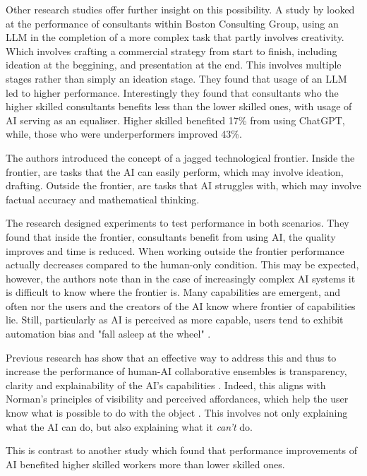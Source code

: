 Other research studies offer further insight on this possibility. A study by \cite{DellAcqua2023-og} looked at the performance of consultants within Boston Consulting Group, using an LLM in the completion of a more complex task that partly involves creativity. Which involves crafting a commercial strategy from start to finish, including ideation at the beggining, and presentation at the end. This involves multiple stages rather than simply an ideation stage. They found that usage of an LLM led to higher performance. Interestingly they found that consultants who the higher skilled consultants benefits less than the lower skilled ones, with usage of AI serving as an equaliser. Higher skilled benefited 17\% from using ChatGPT, while, those who were underperformers improved 43\%. 

The authors introduced the concept of a jagged technological frontier. Inside the frontier, are tasks that the AI can easily perform, which may involve ideation, drafting. Outside the frontier, are tasks that AI struggles with, which may involve factual accuracy and mathematical thinking. 

The research designed experiments to test performance in both scenarios. They found that inside the frontier, consultants benefit from using AI, the quality improves and time is reduced. When working outside the frontier performance actually decreases compared to the human-only condition. This may be expected, however, the authors note than in the case of increasingly complex AI systems it is difficult to know where the frontier is. Many capabilities are emergent, and often nor the users and the creators of the AI know where frontier of capabilities lie. Still, particularly as AI is perceived as more capable, users tend to exhibit automation bias and "fall asleep at the wheel" \cite{Dell-Acqua2022-dy}. 

Previous research has show that an effective way to address this and thus to increase the performance of human-AI collaborative ensembles is transparency, clarity and explainability of the AI's capabilities \cite{Jia2024-vp}. Indeed, this aligns with Norman's principles of visibility and perceived affordances, which help the user know what is possible to do with the object \cite{Norman1988-uq, Bray2016-ff}. This involves not only explaining what the AI can do, but also explaining what it \textit{can't} do. 

This is contrast to another study which found that performance improvements of AI benefited higher skilled workers more than lower skilled ones. 

